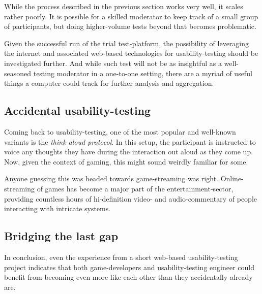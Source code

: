 \documentclass{article}
\begin{document}
\begin{multicols*}{2}[]
    While the process described in the previous section works very well, it
    scales rather poorly. It is possible for a skilled moderator to keep track
    of a small group of participants, but doing higher-volume tests beyond that
    becomes problematic.

    Given the successful run of the trial test-platform, the possibility
    of leveraging the internet and associated web-based technologies for
    usability-testing should be investigated further.
    And while such test will not be as insightful as a well-seasoned testing
    moderator in a one-to-one setting, there are a myriad of useful things a
    computer could track for further analysis and aggregation.

  \subsection*{Accidental usability-testing}

    Coming back to usability-testing, one of the most popular and
    well-known variants is the \textit{think aloud protocol}. In this setup,
    the participant is instructed to voice any thoughts they have during the
    interaction out aloud as they come up. Now, given the context of gaming,
    this might sound weirdly familiar for some.

    Anyone guessing this was headed towards game-streaming was right.
    Online-streaming of games has become a major part of the
    entertainment-sector, providing countless hours of hi-definition video- and
    audio-commentary of people interacting with intricate systems.

  \subsection*{Bridging the last gap}

    In conclusion, even the experience from a short web-based usability-testing
    project indicates that both game-developers and usability-testing engineer
    could benefit from becoming even more like each other than they
    accidentally already are.

  \\ \ \\
  {
    \hspace*{\fill}
  }

  \end{multicols*}
\end{document}
